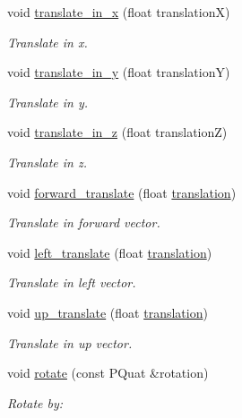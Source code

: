 \begin{DoxyCompactItemize}
void \mbox{\hyperlink{classprz_1_1_transform_a747b5f97e713135c2c5e3ade5d552222}{translate\+\_\+in\+\_\+x}} (float translationX)
\begin{DoxyCompactList}\small\item\em Translate in x. \end{DoxyCompactList}\item 
void \mbox{\hyperlink{classprz_1_1_transform_afb0dde38647898af14e4fe28252f729e}{translate\+\_\+in\+\_\+y}} (float translationY)
\begin{DoxyCompactList}\small\item\em Translate in y. \end{DoxyCompactList}\item 
void \mbox{\hyperlink{classprz_1_1_transform_a1d30233027b9135f0a35c304b3cd0ec6}{translate\+\_\+in\+\_\+z}} (float translationZ)
\begin{DoxyCompactList}\small\item\em Translate in z. \end{DoxyCompactList}\item 
void \mbox{\hyperlink{classprz_1_1_transform_a6f7a77db1c8c8d411a279932f7e826eb}{forward\+\_\+translate}} (float \mbox{\hyperlink{classprz_1_1_transform_ab23448e27c3d383e9e494c1518058ee8}{translation}})
\begin{DoxyCompactList}\small\item\em Translate in forward vector. \end{DoxyCompactList}\item 
void \mbox{\hyperlink{classprz_1_1_transform_a5f942740959b5816e2bb4e2789098782}{left\+\_\+translate}} (float \mbox{\hyperlink{classprz_1_1_transform_ab23448e27c3d383e9e494c1518058ee8}{translation}})
\begin{DoxyCompactList}\small\item\em Translate in left vector. \end{DoxyCompactList}\item 
void \mbox{\hyperlink{classprz_1_1_transform_aa43ec7c6cd3a915c79c32b092dd54a34}{up\+\_\+translate}} (float \mbox{\hyperlink{classprz_1_1_transform_ab23448e27c3d383e9e494c1518058ee8}{translation}})
\begin{DoxyCompactList}\small\item\em Translate in up vector. \end{DoxyCompactList}\item 
void \mbox{\hyperlink{classprz_1_1_transform_a09445992f10a03c34ef18279537cf082}{rotate}} (const P\+Quat \&rotation)
\begin{DoxyCompactList}\small\item\em Rotate by\+: \end{DoxyCompactList}\item 

\end{DoxyCompactItemize}
